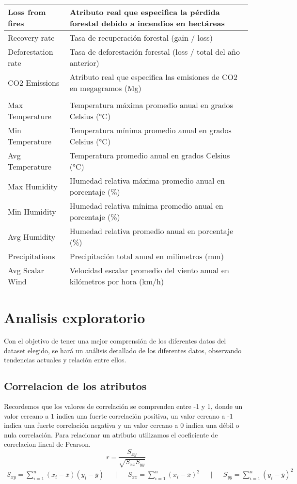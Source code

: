 \documentclass[11pt]{article}
\begin{document}
\begin{table}[H]
\begin{tabularx}{\textwidth}{|>{\hsize=0.2\hsize}X|>{\hsize=0.8\hsize}X|}
\hline
Loss from fires & Atributo real que especifica la pérdida forestal debido a incendios en hectáreas \\
\hline
Recovery rate & Tasa de recuperación forestal (gain / loss) \\
\hline
Deforestation rate & Tasa de deforestación forestal (loss / total del año anterior) \\
\hline
CO2 Emissions & Atributo real que especifica las emisiones de CO2 en megagramos (Mg) \\
\hline
\rowcolor{gray!30}
\multicolumn{2}{|c|}{\textbf{Atributos Meteorológicos}} \\
\hline
Max Temperature & Temperatura máxima promedio anual en grados Celsius (°C) \\
\hline
Min Temperature & Temperatura mínima promedio anual en grados Celsius (°C) \\
\hline
Avg Temperature & Temperatura promedio anual en grados Celsius (°C) \\
\hline
Max Humidity & Humedad relativa máxima promedio anual en porcentaje (\%) \\
\hline
Min Humidity & Humedad relativa mínima promedio anual en porcentaje (\%) \\
\hline
Avg Humidity & Humedad relativa promedio anual en porcentaje (\%) \\
\hline
Precipitations & Precipitación total anual en milímetros (mm) \\
\hline
Avg Scalar Wind & Velocidad escalar promedio del viento anual en kilómetros por hora (km/h) \\
\hline
\end{tabularx}
\end{table}

\section{Analisis exploratorio}
Con el objetivo de tener una mejor comprensión de los diferentes datos del dataset elegido, se hará un análisis detallado de los diferentes datos, observando tendencias actuales y relación entre ellos.

\subsection{Correlacion de los atributos}
Recordemos que los valores de correlación se comprenden entre -1 y 1, donde un valor cercano a 1 indica una fuerte correlación positiva, un valor cercano a -1 indica una fuerte correlación negativa y un valor cercano a 0 indica una débil o nula correlación. 
Para relacionar un atributo utilizamos el coeficiente de correlacion lineal de Pearson.
\begin{equation*}
r = \frac{S_{xy}}{\sqrt{S_{xx}S_{yy}}}
\end{equation*}
\begin{align*}
S_{xy} = \sum_{i=1}^{n} (x_i - \bar{x})(y_i - \bar{y}) && | &&
S_{xx} = \sum_{i=1}^{n} (x_i - \bar{x})^2 && | &&
S_{yy} = \sum_{i=1}^{n} (y_i - \bar{y})^2
\end{align*}
\end{document}
